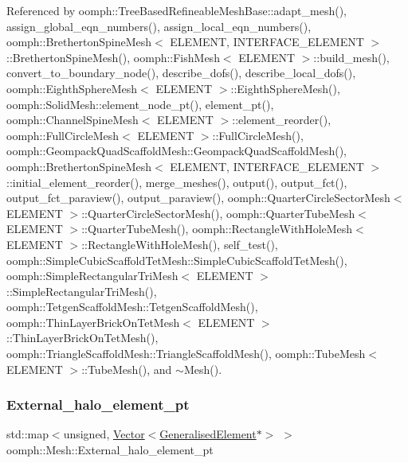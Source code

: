 Referenced by oomph\+::\+Tree\+Based\+Refineable\+Mesh\+Base\+::adapt\+\_\+mesh(), assign\+\_\+global\+\_\+eqn\+\_\+numbers(), assign\+\_\+local\+\_\+eqn\+\_\+numbers(), oomph\+::\+Bretherton\+Spine\+Mesh$<$ E\+L\+E\+M\+E\+N\+T, I\+N\+T\+E\+R\+F\+A\+C\+E\+\_\+\+E\+L\+E\+M\+E\+N\+T $>$\+::\+Bretherton\+Spine\+Mesh(), oomph\+::\+Fish\+Mesh$<$ E\+L\+E\+M\+E\+N\+T $>$\+::build\+\_\+mesh(), convert\+\_\+to\+\_\+boundary\+\_\+node(), describe\+\_\+dofs(), describe\+\_\+local\+\_\+dofs(), oomph\+::\+Eighth\+Sphere\+Mesh$<$ E\+L\+E\+M\+E\+N\+T $>$\+::\+Eighth\+Sphere\+Mesh(), oomph\+::\+Solid\+Mesh\+::element\+\_\+node\+\_\+pt(), element\+\_\+pt(), oomph\+::\+Channel\+Spine\+Mesh$<$ E\+L\+E\+M\+E\+N\+T $>$\+::element\+\_\+reorder(), oomph\+::\+Full\+Circle\+Mesh$<$ E\+L\+E\+M\+E\+N\+T $>$\+::\+Full\+Circle\+Mesh(), oomph\+::\+Geompack\+Quad\+Scaffold\+Mesh\+::\+Geompack\+Quad\+Scaffold\+Mesh(), oomph\+::\+Bretherton\+Spine\+Mesh$<$ E\+L\+E\+M\+E\+N\+T, I\+N\+T\+E\+R\+F\+A\+C\+E\+\_\+\+E\+L\+E\+M\+E\+N\+T $>$\+::initial\+\_\+element\+\_\+reorder(), merge\+\_\+meshes(), output(), output\+\_\+fct(), output\+\_\+fct\+\_\+paraview(), output\+\_\+paraview(), oomph\+::\+Quarter\+Circle\+Sector\+Mesh$<$ E\+L\+E\+M\+E\+N\+T $>$\+::\+Quarter\+Circle\+Sector\+Mesh(), oomph\+::\+Quarter\+Tube\+Mesh$<$ E\+L\+E\+M\+E\+N\+T $>$\+::\+Quarter\+Tube\+Mesh(), oomph\+::\+Rectangle\+With\+Hole\+Mesh$<$ E\+L\+E\+M\+E\+N\+T $>$\+::\+Rectangle\+With\+Hole\+Mesh(), self\+\_\+test(), oomph\+::\+Simple\+Cubic\+Scaffold\+Tet\+Mesh\+::\+Simple\+Cubic\+Scaffold\+Tet\+Mesh(), oomph\+::\+Simple\+Rectangular\+Tri\+Mesh$<$ E\+L\+E\+M\+E\+N\+T $>$\+::\+Simple\+Rectangular\+Tri\+Mesh(), oomph\+::\+Tetgen\+Scaffold\+Mesh\+::\+Tetgen\+Scaffold\+Mesh(), oomph\+::\+Thin\+Layer\+Brick\+On\+Tet\+Mesh$<$ E\+L\+E\+M\+E\+N\+T $>$\+::\+Thin\+Layer\+Brick\+On\+Tet\+Mesh(), oomph\+::\+Triangle\+Scaffold\+Mesh\+::\+Triangle\+Scaffold\+Mesh(), oomph\+::\+Tube\+Mesh$<$ E\+L\+E\+M\+E\+N\+T $>$\+::\+Tube\+Mesh(), and $\sim$\+Mesh().

\mbox{\label{classoomph_1_1Mesh_afb2def03c6259295dbd65303584edf31}} 
\subsubsection{\texorpdfstring{External\+\_\+halo\+\_\+element\+\_\+pt}{External\_halo\_element\_pt}}
{\footnotesize\ttfamily std\+::map$<$unsigned, \hyperlink{classoomph_1_1Vector}{Vector}$<$\hyperlink{classoomph_1_1GeneralisedElement}{Generalised\+Element}$\ast$$>$ $>$ oomph\+::\+Mesh\+::\+External\+\_\+halo\+\_\+element\+\_\+pt\hspace{0.3cm}{\ttfamily [protected]}}



